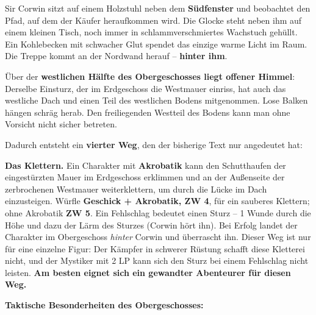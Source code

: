 \documentclass[10pt,a4paper]{article}
\begin{document}
Sir Corwin sitzt auf einem Holzstuhl neben dem \textbf{Südfenster} und beobachtet den Pfad, auf dem der Käufer heraufkommen wird. Die Glocke steht neben ihm auf einem kleinen Tisch, noch immer in schlammverschmiertes Wachstuch gehüllt. Ein Kohlebecken mit schwacher Glut spendet das einzige warme Licht im Raum. Die Treppe kommt an der Nordwand herauf -- \textbf{hinter ihm}.

Über der \textbf{westlichen Hälfte des Obergeschosses liegt offener Himmel}: Derselbe Einsturz, der im Erdgeschoss die Westmauer einriss, hat auch das westliche Dach und einen Teil des westlichen Bodens mitgenommen. Lose Balken hängen schräg herab. Den freiliegenden Westteil des Bodens kann man ohne Vorsicht nicht sicher betreten.

Dadurch entsteht ein \textbf{vierter Weg}, den der bisherige Text nur angedeutet hat:

\textbf{Das Klettern.} Ein Charakter mit \textbf{Akrobatik} kann den Schutthaufen der eingestürzten Mauer im Erdgeschoss erklimmen und an der Außenseite der zerbrochenen Westmauer weiterklettern, um durch die Lücke im Dach einzusteigen. Würfle \textbf{Geschick + Akrobatik, ZW 4}, für ein sauberes Klettern; ohne Akrobatik \textbf{ZW 5}. Ein Fehlschlag bedeutet einen Sturz -- 1 Wunde durch die Höhe und dazu der Lärm des Sturzes (Corwin hört ihn). Bei Erfolg landet der Charakter im Obergeschoss \emph{hinter} Corwin und überrascht ihn. Dieser Weg ist nur für eine einzelne Figur: Der Kämpfer in schwerer Rüstung schafft diese Kletterei nicht, und der Mystiker mit 2 LP kann sich den Sturz bei einem Fehlschlag nicht leisten. \textbf{Am besten eignet sich ein gewandter Abenteurer für diesen Weg.}

\par{}\noindent\textbf{Taktische Besonderheiten des Obergeschosses:}
\end{document}
